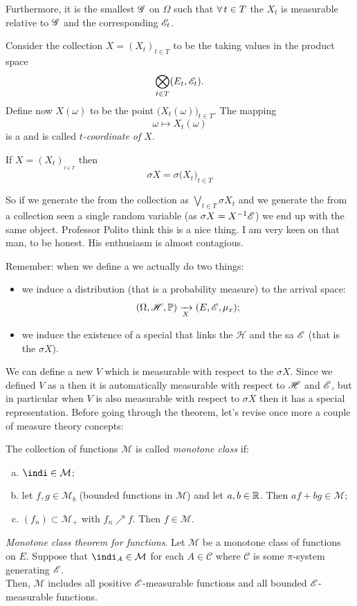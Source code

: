 \documentclass{report}
\begin{document}
Furthermore, it is the smallest \sa{} $\mathscr{G}$ on $\Omega$ such that $\forall\, t\in T$ the \rv{} $X_t$ is measurable relative to $\mathscr{G}$ and the corresponding $\mathscr{E}_t$.
\begin{remark}
	Consider the collection $X={(X_{t})}_{t\in T}$ to be the \rv{} taking values in the product space 
	\[\bigotimes_{t\in T}(E_t,\mathscr{E}_t).\]
	Define now $X(\omega)$ to be the point $\Big(X_t(\omega)\Big)_{t\in T}$. The mapping 
	\[\omega\mapsto X_t(\omega)\]
	is a \rv{} and is called \emph{$t$-coordinate of $X$}.
\end{remark}
\begin{proposition}
	If $X=(X_{t})_{_{t\in T}}$ then $$\sigma X=\sigma{\Big(X_{t}\Big)}_{t\in T}$$
\end{proposition}
So if we generate the \sa{} from the collection as $\bigvee_{t\in T}\sigma X_t$ and we generate the \sa{} from a collection seen a single random variable (as $\sigma X=X^{-1}\mathscr{E}$) we end up with the same object. Professor Polito think this is a nice thing. I am very keen on that man, to be honest. His enthusiasm is almost contagious.\par
Remember: when we define a \rv{} we actually do two things:
\begin{itemize}
	\item we induce a distribution (that is a probability measure) to the arrival space:
	\[(\Omega,\mathscr{H},\mathbb{P})\xrightarrow[X]{}(E,\mathscr{E},\mu_x);\]
	\item we induce the existence of a special \sa{} that links the \sa{} $\mathscr{H}$ and the sa $\mathscr{E}$ (that is the \sa{} $\sigma X$).
\end{itemize}
We can define a new \rv{} $V$ which is measurable with respect to the \sa{} $\sigma X$. Since we defined $V$ as a \rv{} then it is automatically measurable with respect to $\mathscr{H}$ and $\mathscr{E}$, but in particular when $V$ is also measurable with respect to $\sigma X$ then it has a special representation. Before going through the theorem, let's revise once more a couple of measure theory concepts:
\begin{revise}
	\begin{definition}
		The collection of functions $\mathcal{M}$ is called \emph{monotone class} if:
		\begin{enumerate}[a)]
			\item $\indi\in\mathcal{M}$;
			\item let $f,g\in\mathcal{M}_b$ (bounded functions in $\mathcal{M}$) and let $a,b\in\mathbb{R}$. Then $af+bg\in\mathcal{M}$;
			\item $(f_n)\subset\mathcal{M}_+$ with $f_n\nearrow f$. Then $f\in\mathcal{M}$.
		\end{enumerate}
	\end{definition}
	\begin{theorem}
		\emph{Monotone class theorem for functions}.
		Let $\mathcal{M}$ be a monotone class of functions on $E$. Suppose that $\indi_A\in\mathcal{M}$ for each $A\in\mathcal{C}$ where $\mathcal{C}$ is some $\pi$-system generating $\mathscr{E}$.\\
		Then, $\mathcal{M}$ includes all positive $\mathscr{E}$-measurable functions and all bounded $\mathscr{E}$-measurable functions.
	\end{theorem}
\end{revise}
\end{document}

